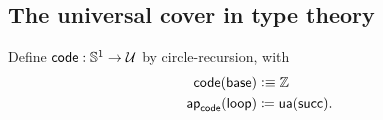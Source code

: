 \documentclass[hott-all.tex]{subfiles}
\begin{document}
\subsection{The universal cover in type theory}
% 
% 
% 
% 
\begin{defn} 
  Define $\mathsf{code} : \mathbb{S} ^1 \to \mathcal{U}$ by circle-recursion, with
  \begin{align*}
    \mathsf{code}(\mathsf{base}) &\vcentcolon\equiv \mathbb{Z} \\
    \mathsf{ap}_{\mathsf{code}}({\mathsf{loop}}) &\coloneqq \mathsf{ua}(\mathsf{succ}).
  \end{align*}
\end{defn}
% 
% 
\end{document}
